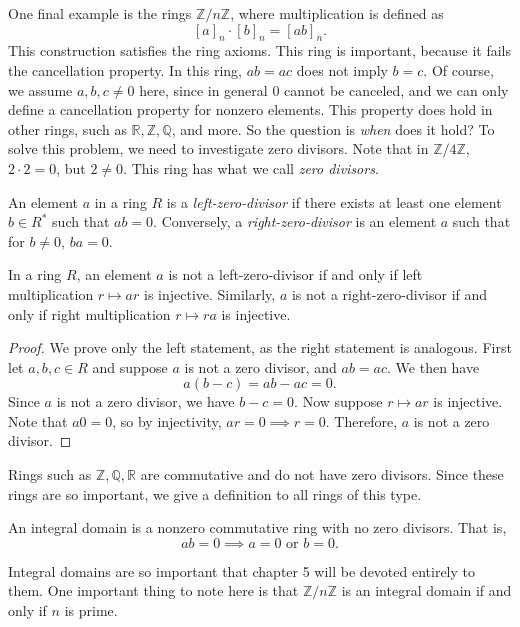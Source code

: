 One final example is the rings $\mathbb{Z}/n\mathbb{Z}$, where multiplication is defined as
\[
	[a]_n \cdot [b]_n = [ab]_n
.\]
This construction satisfies the ring axioms. This ring is important, because it fails the cancellation property. In this ring, $ab = ac$ does not imply $b=c$. Of course, we assume $a,b,c\neq 0$ here, since in general $0$ cannot be canceled, and we can only define a cancellation property for nonzero elements. This property does hold in other rings, such as $\mathbb{R},\mathbb{Z},\mathbb{Q}$, and more. So the question is \emph{when} does it hold? To solve this problem, we need to investigate zero divisors. Note that in $\mathbb{Z}/4\mathbb{Z}$, $2\cdot 2=0$, but $2\neq 0$. This ring has what we call \emph{zero divisors}.
\begin{definition}\label{dfn:3.1.3}
	An element $a$ in a ring $R$ is a \emph{left-zero-divisor} if there exists at least one element $b\in R^*$ such that $ab=0$. Conversely, a \emph{right-zero-divisor} is an element $a$ such that for $b\neq 0$, $ba=0$.
\end{definition}
\begin{proposition}\label{prp:3.1.1}
	In a ring $R$, an element $a$ is not a left-zero-divisor if and only if left multiplication $r\mapsto ar$ is injective. Similarly, $a$ is not a right-zero-divisor if and only if right multiplication $r\mapsto ra$ is injective.
\end{proposition}
\begin{proof}
	We prove only the left statement, as the right statement is analogous. First let $a,b,c\in R$ and suppose $a$ is not a zero divisor, and $ab=ac$. We then have
	\[
		a(b-c)=ab-ac=0
	.\]
	Since $a$ is not a zero divisor, we have $b-c=0$. Now suppose $r\mapsto ar$ is injective. Note that $a0=0$, so by injectivity, $ar=0 \implies r=0$. Therefore, $a$ is not a zero divisor.
\end{proof}
Rings such as $\mathbb{Z},\mathbb{Q},\mathbb{R}$ are commutative and do not have zero divisors. Since these rings are so important, we give a definition to all rings of this type.
\begin{definition}\label{dfn:3.1.4}
	An integral domain is a nonzero commutative ring with no zero divisors. That is,
	\[
		ab=0 \implies a=0\text{ or }b=0
	.\]
\end{definition}
Integral domains are so important that chapter 5 will be devoted entirely to them. One important thing to note here is that $\mathbb{Z}/n\mathbb{Z}$ is an integral domain if and only if $n$ is prime.


